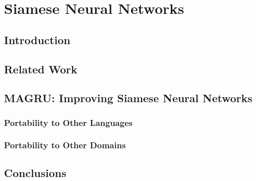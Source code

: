 \chapter{\label{cha:sts_siamese_neural_networks}Siamese Neural Networks}

\section{Introduction}
\cite{ranasinghe-etal-2019-semantic}
\section{Related Work}

\section{MAGRU: Improving Siamese Neural Networks}

\subsection{Portability to Other Languages}

\subsection{Portability to Other Domains}

\section{Conclusions}